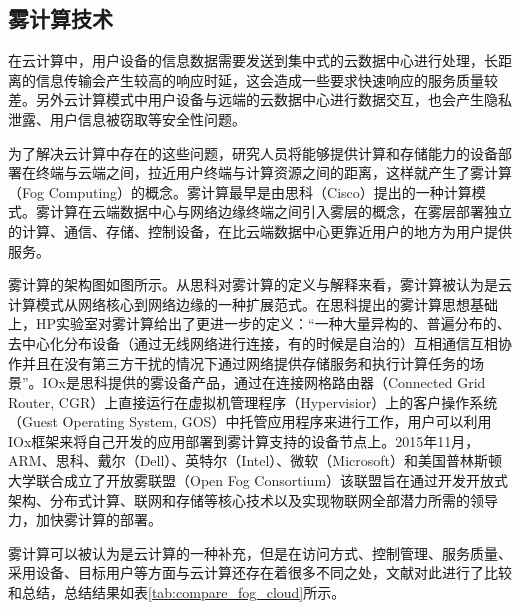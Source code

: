 \subsection{雾计算技术}

在云计算中，用户设备的信息数据需要发送到集中式的云数据中心进行处理，长距离的信息传输会产生较高的响应时延，这会造成一些要求快速响应的服务质量较差。另外云计算模式中用户设备与远端的云数据中心进行数据交互，也会产生隐私泄露、用户信息被窃取等安全性问题。

为了解决云计算中存在的这些问题，研究人员将能够提供计算和存储能力的设备部署在终端与云端之间，拉近用户终端与计算资源之间的距离，这样就产生了雾计算（Fog Computing）的概念。雾计算最早是由思科（Cisco）提出的一种计算模式。雾计算在云端数据中心与网络边缘终端之间引入雾层的概念，在雾层部署独立的计算、通信、存储、控制设备，在比云端数据中心更靠近用户的地方为用户提供服务\cite{贾维嘉2018雾计算的概念}。

雾计算的架构图如图所示。从思科对雾计算的定义与解释来看，雾计算被认为是云计算模式从网络核心到网络边缘的一种扩展范式。在思科提出的雾计算思想基础上，HP实验室对雾计算给出了更进一步的定义：“一种大量异构的、普遍分布的、去中心化分布设备（通过无线网络进行连接，有的时候是自治的）互相通信互相协作并且在没有第三方干扰的情况下通过网络提供存储服务和执行计算任务的场景”\cite{vaquero2014finding}。IOx是思科提供的雾设备产品，通过在连接网格路由器（Connected Grid Router, CGR）上直接运行在虚拟机管理程序（Hypervisior）上的客户操作系统（Guest Operating System, GOS）中托管应用程序来进行工作\cite{yi2015survey}，用户可以利用IOx框架来将自己开发的应用部署到雾计算支持的设备节点上。2015年11月，ARM、思科、戴尔（Dell）、英特尔（Intel）、微软（Microsoft）和美国普林斯顿大学联合成立了开放雾联盟（Open Fog Consortium）该联盟旨在通过开发开放式架构、分布式计算、联网和存储等核心技术以及实现物联网全部潜力所需的领导力，加快雾计算的部署\cite{李子姝2018移动边缘计算综述}。

雾计算可以被认为是云计算的一种补充，但是在访问方式、控制管理、服务质量、采用设备、目标用户等方面与云计算还存在着很多不同之处，文献\cite{贾维嘉2018雾计算的概念}对此进行了比较和总结，总结结果如表\ref{tab:compare_fog_cloud}所示。

